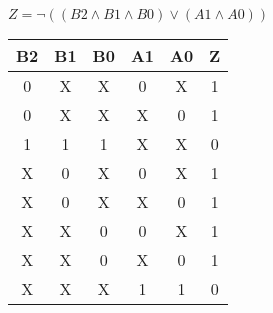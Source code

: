 
\begin{center}
    {\(Z = \lnot ((B2 \land B1 \land B0) \lor (A1 \land A0)) \)}
    \begin{table}[h] %
        \begin{center}
            \begin{tabular}{|c|c|c|c|c||c|} \hline
            B2 & B1 & B0 & A1 & A0 & Z \\ \hline\hline
            0  & X  & X  & 0  & X  & 1\\ \hline
            0  & X  & X  & X  & 0  & 1\\ \hline
            1  & 1  & 1  & X  & X  & 0\\ \hline
            X  & 0  & X  & 0  & X  & 1\\ \hline
            X  & 0  & X  & X  & 0  & 1\\ \hline
            X  & X  & 0  & 0  & X  & 1\\ \hline
            X  & X  & 0  & X  & 0  & 1\\ \hline
            X  & X  & X  & 1  & 1  & 0\\ \hline
            \end{tabular}
        \end{center}
    \end{table}
\end{center}
